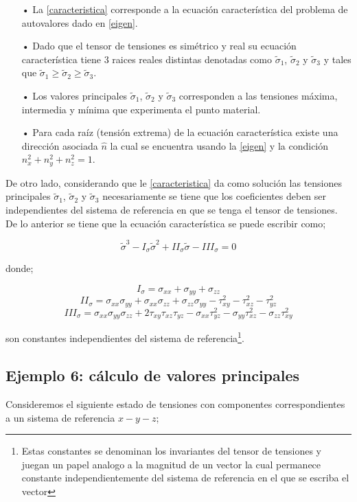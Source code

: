 \documentclass[../notas medios.tex]{subfiles}
\begin{document}
\begin{itemize}
\item[•] La \cref{caracteristica} corresponde a la ecuación  característica del problema de autovalores dado en \cref{eigen}.
\item[•] Dado que el tensor de tensiones es simétrico y real su ecuación característica tiene 3 raices reales distintas denotadas como ${{\tilde \sigma }_1}$, ${{\tilde \sigma }_2}$ y ${{\tilde \sigma }_3}$ y tales que ${{\tilde \sigma }_1} \geq{{\tilde \sigma }_2} \geq {{\tilde \sigma }_3}$.
\item[•] Los valores principales ${{\tilde \sigma }_1}$, ${{\tilde \sigma }_2}$ y ${{\tilde \sigma }_3}$ corresponden a las tensiones máxima, intermedia y mínima que experimenta el punto material. 
\item[•] Para cada raíz (tensión extrema) de la ecuación característica existe una dirección asociada $\hat{n}$ la cual se encuentra usando la \cref{eigen} y la condición $n_x^2 + n_y^2 + n_z^2 = 1.$
\end{itemize}

De otro lado, considerando que le \cref{caracteristica} da como solución las tensiones principales ${{\tilde \sigma }_1}$, ${{\tilde \sigma }_2}$ y ${{\tilde \sigma }_3}$ necesariamente se tiene que los coeficientes deben ser independientes del sistema de referencia en que se tenga el tensor de tensiones. De lo anterior se tiene que la ecuación característica se puede escribir como;

\[{{\tilde \sigma }^3} - {I_\sigma }{{\tilde \sigma }^2} + I{I_\sigma }\tilde \sigma  - II{I_\sigma } = 0\]

donde;

\[{I_\sigma } = {\sigma _{xx}} + {\sigma _{yy}} + {\sigma _{zz}}\]
\[I{I_\sigma } = {\sigma _{xx}}{\sigma _{yy}} + {\sigma _{xx}}{\sigma _{zz}} + {\sigma _{zz}}{\sigma _{yy}} - \tau _{xy}^2 - \tau _{xz}^2 - \tau _{yz}^2\]
\[II{I_\sigma } = {\sigma _{xx}}{\sigma _{yy}}{\sigma _{zz}} + 2{\tau _{xy}}{\tau _{xz}}{\tau _{yz}} - {\sigma _{xx}}\tau _{yz}^2 - {\sigma _{yy}}\tau _{xz}^2 - {\sigma _{zz}}\tau _{xy}^2\]

son constantes independientes del sistema de referencia\footnote{Estas constantes se denominan los invariantes del tensor de tensiones y juegan un papel analogo a la magnitud de un vector la cual permanece constante independientemente del sistema de referencia en el que se escriba el vector}.

\subsection*{Ejemplo 6: cálculo de valores principales}
Consideremos el siguiente estado de tensiones con componentes correspondientes a un sistema de referencia $x-y-z$;
\end{document}
